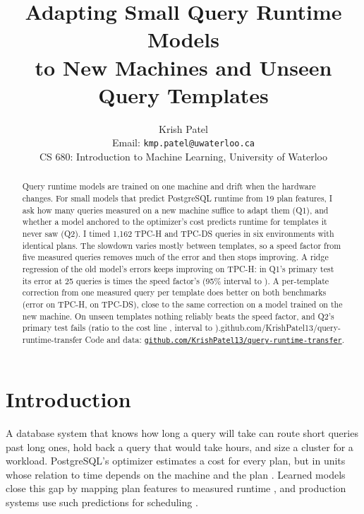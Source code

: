 \documentclass{article}
\title{Adapting Small Query Runtime Models\\to New Machines and Unseen Query Templates}
\author{Krish Patel\\
Email: \texttt{kmp.patel@uwaterloo.ca}\\
CS 680: Introduction to Machine Learning, University of Waterloo}
\date{}
\newcommand{\codeurl}{github.com/KrishPatel13/query-runtime-transfer}
\begin{document}
\maketitle

\begin{abstract}
Query runtime models are trained on one machine and drift when the hardware changes. For small models that predict PostgreSQL runtime from 19 plan features, I ask how many queries measured on a new machine suffice to adapt them (Q1), and whether a model anchored to the optimizer's cost predicts runtime for templates it never saw (Q2). I timed 1,162 TPC-H and TPC-DS queries in six environments with identical plans. The slowdown varies mostly between templates, so a speed factor from five measured queries removes much of the error and then stops improving. A ridge regression of the old model's errors keeps improving on TPC-H: in Q1's primary test its error at 25 queries is \PrimaryGeo{} times the speed factor's (95\% interval \PrimaryGeoLo{} to \PrimaryGeoHi). A per-template correction from one measured query per template does better on both benchmarks (error \PLadTpchLowdimTemplateRoundRobin{} on TPC-H, \PLadTpcdsLowdimTemplateRoundRobin{} on TPC-DS), close to the same correction on a model trained on the new machine. On unseen templates nothing reliably beats the speed factor, and Q2's primary test fails (ratio to the cost line \CFourGeo, interval \CFourGeoLo{} to \CFourGeoHi).\ifx\codeurl\empty\else{} Code and data: \href{https://\codeurl}{\nolinkurl{\codeurl}}.\fi
\end{abstract}

\section{Introduction}
A database system that knows how long a query will take can route short queries past long ones, hold back a query that would take hours, and size a cluster for a workload. PostgreSQL's optimizer estimates a cost for every plan, but in units whose relation to time depends on the machine and the plan \parencite{wu2013}. Learned models close this gap by mapping plan features to measured runtime \parencite{ganapathi2009,akdere2012,marcus2019}, and production systems use such predictions for scheduling \parencite{wu2024stage}.
\end{document}
